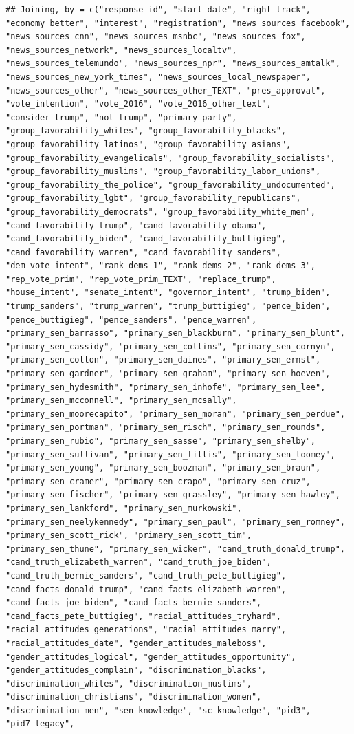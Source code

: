 \documentclass[
]{article}
\begin{document}
\begin{verbatim}
## Joining, by = c("response_id", "start_date", "right_track", "economy_better", "interest", "registration", "news_sources_facebook", "news_sources_cnn", "news_sources_msnbc", "news_sources_fox", "news_sources_network", "news_sources_localtv", "news_sources_telemundo", "news_sources_npr", "news_sources_amtalk", "news_sources_new_york_times", "news_sources_local_newspaper", "news_sources_other", "news_sources_other_TEXT", "pres_approval", "vote_intention", "vote_2016", "vote_2016_other_text", "consider_trump", "not_trump", "primary_party", "group_favorability_whites", "group_favorability_blacks", "group_favorability_latinos", "group_favorability_asians", "group_favorability_evangelicals", "group_favorability_socialists", "group_favorability_muslims", "group_favorability_labor_unions", "group_favorability_the_police", "group_favorability_undocumented", "group_favorability_lgbt", "group_favorability_republicans", "group_favorability_democrats", "group_favorability_white_men", "cand_favorability_trump", "cand_favorability_obama", "cand_favorability_biden", "cand_favorability_buttigieg", "cand_favorability_warren", "cand_favorability_sanders", "dem_vote_intent", "rank_dems_1", "rank_dems_2", "rank_dems_3", "rep_vote_prim", "rep_vote_prim_TEXT", "replace_trump", "house_intent", "senate_intent", "governor_intent", "trump_biden", "trump_sanders", "trump_warren", "trump_buttigieg", "pence_biden", "pence_buttigieg", "pence_sanders", "pence_warren", "primary_sen_barrasso", "primary_sen_blackburn", "primary_sen_blunt", "primary_sen_cassidy", "primary_sen_collins", "primary_sen_cornyn", "primary_sen_cotton", "primary_sen_daines", "primary_sen_ernst", "primary_sen_gardner", "primary_sen_graham", "primary_sen_hoeven", "primary_sen_hydesmith", "primary_sen_inhofe", "primary_sen_lee", "primary_sen_mcconnell", "primary_sen_mcsally", "primary_sen_moorecapito", "primary_sen_moran", "primary_sen_perdue", "primary_sen_portman", "primary_sen_risch", "primary_sen_rounds", "primary_sen_rubio", "primary_sen_sasse", "primary_sen_shelby", "primary_sen_sullivan", "primary_sen_tillis", "primary_sen_toomey", "primary_sen_young", "primary_sen_boozman", "primary_sen_braun", "primary_sen_cramer", "primary_sen_crapo", "primary_sen_cruz", "primary_sen_fischer", "primary_sen_grassley", "primary_sen_hawley", "primary_sen_lankford", "primary_sen_murkowski", "primary_sen_neelykennedy", "primary_sen_paul", "primary_sen_romney", "primary_sen_scott_rick", "primary_sen_scott_tim", "primary_sen_thune", "primary_sen_wicker", "cand_truth_donald_trump", "cand_truth_elizabeth_warren", "cand_truth_joe_biden", "cand_truth_bernie_sanders", "cand_truth_pete_buttigieg", "cand_facts_donald_trump", "cand_facts_elizabeth_warren", "cand_facts_joe_biden", "cand_facts_bernie_sanders", "cand_facts_pete_buttigieg", "racial_attitudes_tryhard", "racial_attitudes_generations", "racial_attitudes_marry", "racial_attitudes_date", "gender_attitudes_maleboss", "gender_attitudes_logical", "gender_attitudes_opportunity", "gender_attitudes_complain", "discrimination_blacks", "discrimination_whites", "discrimination_muslims", "discrimination_christians", "discrimination_women", "discrimination_men", "sen_knowledge", "sc_knowledge", "pid3", "pid7_legacy", 
\end{verbatim}
\end{document}

